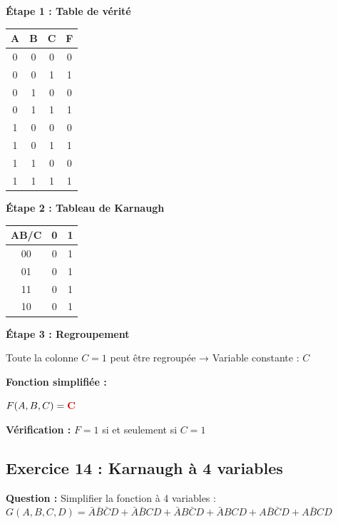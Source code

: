 \documentclass[12pt,a4paper]{article}
\begin{document}
\begin{solution}
\textbf{Étape 1 : Table de vérité}

\begin{center}
\begin{tabular}{|c|c|c|c|}
\hline
\textbf{A} & \textbf{B} & \textbf{C} & \textbf{F} \\
\hline
0 & 0 & 0 & 0 \\
0 & 0 & 1 & 1 \\
0 & 1 & 0 & 0 \\
0 & 1 & 1 & 1 \\
1 & 0 & 0 & 0 \\
1 & 0 & 1 & 1 \\
1 & 1 & 0 & 0 \\
1 & 1 & 1 & 1 \\
\hline
\end{tabular}
\end{center}

\textbf{Étape 2 : Tableau de Karnaugh}

\begin{center}
\begin{tabular}{|c|c|c|}
\hline
\textbf{AB/C} & \textbf{0} & \textbf{1} \\
\hline
00 & 0 & 1 \\
\hline
01 & 0 & 1 \\
\hline
11 & 0 & 1 \\
\hline
10 & 0 & 1 \\
\hline
\end{tabular}
\end{center}

\textbf{Étape 3 : Regroupement}

Toute la colonne $C=1$ peut être regroupée → Variable constante : $C$

\textbf{Fonction simplifiée :}

$F(A,B,C) = \textcolor{importantrouge}{\textbf{C}}$

\textbf{Vérification :} $F = 1$ si et seulement si $C = 1$
\end{solution}

\newpage
\subsection{Exercice 14 : Karnaugh à 4 variables}

\begin{exercice}
\textbf{Question :} Simplifier la fonction à 4 variables :
$G(A,B,C,D) = \bar{A}\bar{B}\bar{C}D + \bar{A}\bar{B}CD + \bar{A}B\bar{C}D + \bar{A}BCD + A\bar{B}\bar{C}D + A\bar{B}CD$
\end{exercice}
\end{document}
